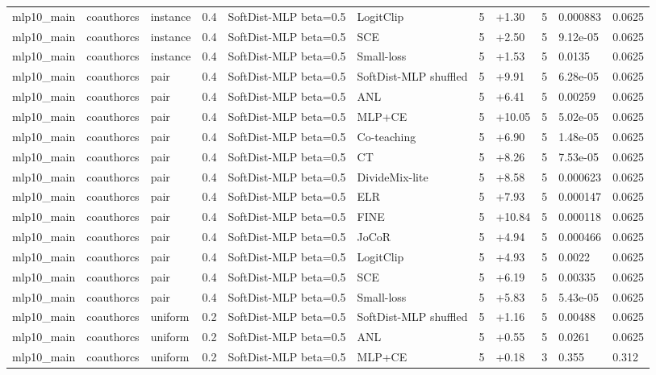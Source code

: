 \begin{table}[t]
\begin{tabular}{llllllrlrll}
mlp10_main & coauthorcs & instance & 0.4 & SoftDist-MLP beta=0.5 & LogitClip & 5 & +1.30 & 5 & 0.000883 & 0.0625 \\
mlp10_main & coauthorcs & instance & 0.4 & SoftDist-MLP beta=0.5 & SCE & 5 & +2.50 & 5 & 9.12e-05 & 0.0625 \\
mlp10_main & coauthorcs & instance & 0.4 & SoftDist-MLP beta=0.5 & Small-loss & 5 & +1.53 & 5 & 0.0135 & 0.0625 \\
mlp10_main & coauthorcs & pair & 0.4 & SoftDist-MLP beta=0.5 & SoftDist-MLP shuffled & 5 & +9.91 & 5 & 6.28e-05 & 0.0625 \\
mlp10_main & coauthorcs & pair & 0.4 & SoftDist-MLP beta=0.5 & ANL & 5 & +6.41 & 5 & 0.00259 & 0.0625 \\
mlp10_main & coauthorcs & pair & 0.4 & SoftDist-MLP beta=0.5 & MLP+CE & 5 & +10.05 & 5 & 5.02e-05 & 0.0625 \\
mlp10_main & coauthorcs & pair & 0.4 & SoftDist-MLP beta=0.5 & Co-teaching & 5 & +6.90 & 5 & 1.48e-05 & 0.0625 \\
mlp10_main & coauthorcs & pair & 0.4 & SoftDist-MLP beta=0.5 & CT & 5 & +8.26 & 5 & 7.53e-05 & 0.0625 \\
mlp10_main & coauthorcs & pair & 0.4 & SoftDist-MLP beta=0.5 & DivideMix-lite & 5 & +8.58 & 5 & 0.000623 & 0.0625 \\
mlp10_main & coauthorcs & pair & 0.4 & SoftDist-MLP beta=0.5 & ELR & 5 & +7.93 & 5 & 0.000147 & 0.0625 \\
mlp10_main & coauthorcs & pair & 0.4 & SoftDist-MLP beta=0.5 & FINE & 5 & +10.84 & 5 & 0.000118 & 0.0625 \\
mlp10_main & coauthorcs & pair & 0.4 & SoftDist-MLP beta=0.5 & JoCoR & 5 & +4.94 & 5 & 0.000466 & 0.0625 \\
mlp10_main & coauthorcs & pair & 0.4 & SoftDist-MLP beta=0.5 & LogitClip & 5 & +4.93 & 5 & 0.0022 & 0.0625 \\
mlp10_main & coauthorcs & pair & 0.4 & SoftDist-MLP beta=0.5 & SCE & 5 & +6.19 & 5 & 0.00335 & 0.0625 \\
mlp10_main & coauthorcs & pair & 0.4 & SoftDist-MLP beta=0.5 & Small-loss & 5 & +5.83 & 5 & 5.43e-05 & 0.0625 \\
mlp10_main & coauthorcs & uniform & 0.2 & SoftDist-MLP beta=0.5 & SoftDist-MLP shuffled & 5 & +1.16 & 5 & 0.00488 & 0.0625 \\
mlp10_main & coauthorcs & uniform & 0.2 & SoftDist-MLP beta=0.5 & ANL & 5 & +0.55 & 5 & 0.0261 & 0.0625 \\
mlp10_main & coauthorcs & uniform & 0.2 & SoftDist-MLP beta=0.5 & MLP+CE & 5 & +0.18 & 3 & 0.355 & 0.312 \\

\end{tabular}
\end{table}
